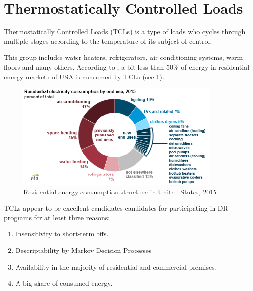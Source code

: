 \section{Thermostatically Controlled Loads}

\begin{definition}
    Thermostatically Controlled Loads (TCLs) is a type of loads who cycles through multiple stages according to the temperature of its subject of control.
\end{definition}
 This group includes water heaters, refrigerators, air conditioning systems, warm floors and many others. According to \cite{EIA2009}, a bit less than 50\% of energy in residential energy markets of USA is consumed by TCLs (see \ref{fig:energy_consumption_in_usa}).

\begin{figure}
    \centering
    \label{fig:energy_consumption_in_usa}
    \includegraphics[width=0.9\textwidth]{figures/energy_consumption_in_usa}
    \caption{Residential energy consumption structure in United States, 2015}
\end{figure}

TCLs appear to be excellent candidates candidates for participating in DR programs for at least three reasons:

\begin{enumerate}
    \item Insensitivity to short-term offs. 
    \item Descriptability by Markov Decision Processes
    \item Availability in the majority of residential and commercial premises. 
    \item A big share of consumed energy.
\end{enumerate}
